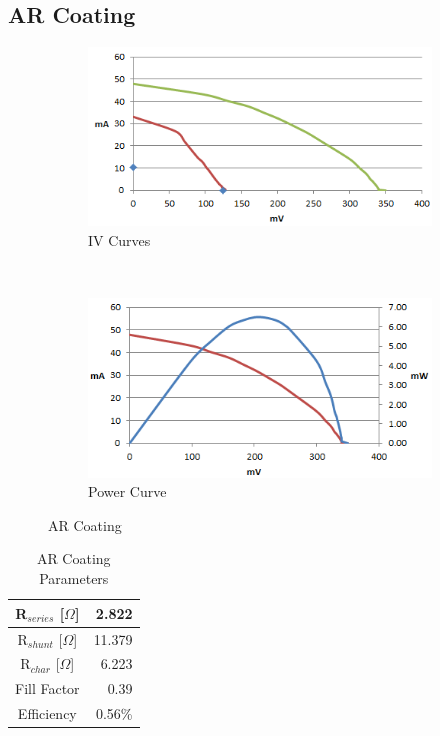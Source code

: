 \documentclass[letter,12pt]{article}
\begin{document}
	\FloatBarrier
	\subsection{AR Coating}
	
		\begin{figure}[h!]
			\centering
			\begin{subfigure}[b]{.45\textwidth}
				\includegraphics[width=\textwidth]{./Images/IV_Curves/AR_IV.png}
				\caption{IV Curves}
			\end{subfigure}
			~
			\begin{subfigure}[b]{.45\textwidth}
				\includegraphics[width=\textwidth]{./Images/IV_Curves/AR_PV.png}
				\caption{Power Curve}
			\end{subfigure}
			
			\caption{AR Coating}
			\label{fig:AR_Coating}
		\end{figure}
		
		\begin{table}[h!]
			\centering
			\begin{tabular}{|c | r|}
				\hline
				R$_{series}$ [$\Omega$] & 2.822 \\
				\hline
				R$_{shunt}$ [$\Omega$] & 11.379 \\
				\hline
				R$_{char}$ [$\Omega$] & 6.223 \\
				\hline
				Fill Factor & 0.39 \\
				\hline
				Efficiency & 0.56\% \\
				\hline
			\end{tabular}
			\caption{AR Coating Parameters}
		\end{table}
		
\end{document}
